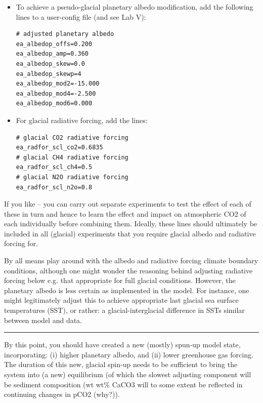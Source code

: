 \documentclass[11pt,fleqn]{book} %
\begin{document}
\begin{itemize}[noitemsep]

\item To achieve a pseudo-glacial planetary albedo modification, add the following lines to a
user-config file (and see Lab V):
\vspace{-1mm}\begin{verbatim}
# adjusted planetary albedo
ea_albedop_offs=0.200
ea_albedop_amp=0.360
ea_albedop_skew=0.0
ea_albedop_skewp=4
ea_albedop_mod2=-15.000
ea_albedop_mod4=-2.500
ea_albedop_mod6=0.000
\end{verbatim}\vspace{-1mm}

\item For glacial radiative forcing, add the lines:
\vspace{-1mm}\begin{verbatim}
# glacial CO2 radiative forcing
ea_radfor_scl_co2=0.6835
# glacial CH4 radiative forcing
ea_radfor_scl_ch4=0.5
# glacial N2O radiative forcing
ea_radfor_scl_n2o=0.8
\end{verbatim}\vspace{-1mm}

\end{itemize}

If you like – you can carry out separate experiments to test the effect of each of these in turn and
hence to learn the effect and impact on atmospheric CO2 of each individually before combining
them. Ideally, these lines should ultimately be included in all (glacial) experiments that you require
glacial albedo and radiative forcing for.

By all means play around with the albedo and radiative forcing climate boundary conditions,
although one might wonder the reasoning behind adjusting radiative forcing below e.g. that
appropriate for full glacial conditions. However, the planetary albedo is less certain as implemented
in the model. For instance, one might legitimately adjust this to achieve appropriate last glacial sea
surface temperatures (SST), or rather: a glacial-interglacial difference in SSTs similar between
model and data.

\vspace{1mm}
\noindent\rule{4cm}{0.5pt}
\vspace{2mm}

By this point, you should have created a new (mostly) spun-up model state, incorporating: (i)
higher planetary albedo, and (ii) lower greenhouse gas forcing. The duration of this new, glacial
spin-up needs to be sufficient to bring the system into (a new) equilibrium (of which the slowest
adjusting component will be sediment composition (wt%
wt\% CaCO3 will to some extent be reflected in continuing changes in pCO2 (why?)).
\end{document}
